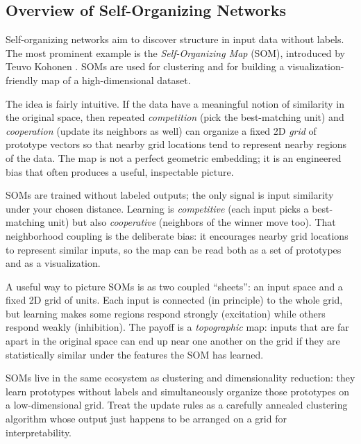 \subsection{Overview of Self-Organizing Networks}
\label{sec:som_overview_of_self_organizing_networks}

Self-organizing networks aim to discover structure in input data without labels. The most prominent example is the \emph{Self-Organizing Map} (SOM), introduced by Teuvo Kohonen \citep{Kohonen1982}. SOMs are used for clustering and for building a visualization-friendly map of a high-dimensional dataset.

The idea is fairly intuitive. If the data have a meaningful notion of similarity in the original space, then repeated \emph{competition} (pick the best-matching unit) and \emph{cooperation} (update its neighbors as well) can organize a fixed 2D \emph{grid} of prototype vectors so that nearby grid locations tend to represent nearby regions of the data. The map is not a perfect geometric embedding; it is an engineered bias that often produces a useful, inspectable picture.

SOMs are trained without labeled outputs; the only signal is input similarity under your chosen distance. Learning is \emph{competitive} (each input picks a best\hyp{}matching unit) but also \emph{cooperative} (neighbors of the winner move too). That neighborhood coupling is the deliberate bias: it encourages nearby grid locations to represent similar inputs, so the map can be read both as a set of prototypes and as a visualization.

\begin{tcolorbox}[summarybox, title={Historical intuition: two sheets and topographic neighborhoods}]
A useful way to picture SOMs is as two coupled ``sheets'': an input space and a fixed 2D grid of units. Each input is connected (in principle) to the whole grid, but learning makes some regions respond strongly (excitation) while others respond weakly (inhibition). The payoff is a \emph{topographic} map: inputs that are far apart in the original space can end up near one another on the grid if they are statistically similar under the features the SOM has learned.
\end{tcolorbox}

\begin{tcolorbox}[summarybox, title={Author's note: tie SOMs back to clustering and dimensionality reduction}]
SOMs live in the same ecosystem as clustering and dimensionality reduction: they learn prototypes without labels and simultaneously organize those prototypes on a low-dimensional grid. Treat the update rules as a carefully annealed clustering algorithm whose output just happens to be arranged on a grid for interpretability.
\end{tcolorbox}

